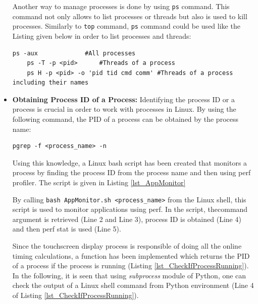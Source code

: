 \begin{itemize}
	Another way to manage processes is done by using \texttt{ps} command. This command not only allows to list processes or threads but also is used to kill processes. Similarly to \texttt{top} command, \texttt{ps} command could be used like the Listing given below in order to list processes and threads:
	\begin{lstlisting}[style=bash]
	ps -aux             #All processes
	ps -T -p <pid>      #Threads of a process
	ps H -p <pid> -o 'pid tid cmd comm' #Threads of a process including their names
	\end{lstlisting}
	
	\item \textbf{Obtaining Process ID of a Process:} Identifying the process ID or a process is crucial in order to work with processes in Linux. By using the following command, the PID of a process can be obtained by the process name:
	\begin{lstlisting}[style=bash]
		pgrep -f <process_name> -n 
	\end{lstlisting}
	Using this knowledge, a Linux bash script has been created that monitors a process by finding the process ID from the process name and then using perf profiler. The script is given in Listing \ref{lst_AppMonitor}
	
	
	By calling \texttt{bash AppMonitor.sh <process\texttt{\_}name>} from the Linux shell, this script is used to monitor applications using perf. In the script, thecommand argument is retrieved (Line 2 and Line 3), process ID is obtained (Line 4) and then perf stat is used (Line 5). 
	
	
	Since the touchscreen display process is responsible of doing all the online timing calculations, a function has been implemented which returns the PID of a process if the process is running (Listing \ref{lst_CheckIfProcessRunning}). In the following, it is seen that using \textit{subprocess} module of Python, one can check the output of a Linux shell command from Python environment (Line 4 of Listing \ref{lst_CheckIfProcessRunning}).
	

\end{itemize}
